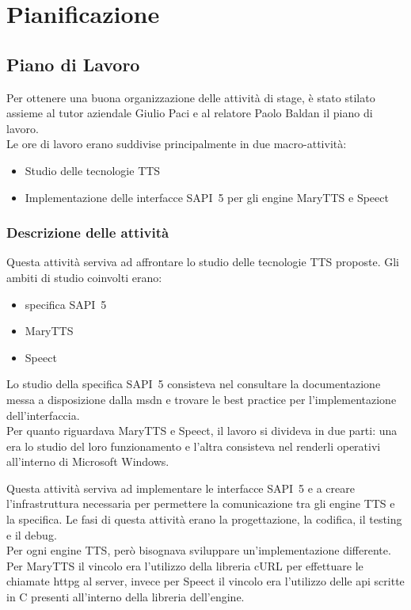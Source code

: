 \chapter{Pianificazione} %
\thispagestyle{empty}

\newpage
\section{Piano di Lavoro}
Per ottenere una buona organizzazione delle attività di stage, è stato stilato assieme al tutor aziendale Giulio Paci e al relatore Paolo Baldan il piano di lavoro.\\
Le ore di lavoro erano suddivise principalmente in due macro-attività:
\begin{itemize}
	\item Studio delle tecnologie TTS
	\item Implementazione delle interfacce SAPI~5 per gli engine MaryTTS e Speect
\end{itemize}

\subsection{Descrizione delle attività}

\begin{description}[style=unboxed]
	\item[Studio delle tecnologie TTS] Questa attività serviva ad affrontare lo studio delle tecnologie TTS proposte. Gli ambiti di studio coinvolti erano:
	\begin{itemize}
		\item specifica SAPI~5
		\item MaryTTS
		\item Speect
	\end{itemize}
	Lo studio della specifica SAPI~5 consisteva nel consultare la documentazione messa a disposizione dalla \gls{msdn} e trovare le best practice per l'implementazione dell'interfaccia.\\
	Per quanto riguardava MaryTTS e Speect, il lavoro si divideva in due parti: una era lo studio del loro funzionamento e l'altra consisteva nel renderli operativi all'interno di Microsoft Windows.\\
	
	\item[Implementazione delle interfacce SAPI~5 per gli engine MaryTTS e Speect]
	Questa attività serviva ad implementare le interfacce SAPI~5 e a creare l'infrastruttura necessaria per permettere la comunicazione tra gli engine TTS e la specifica. Le fasi di questa attività erano la progettazione, la codifica, il testing e il debug.\\
	Per ogni engine TTS, però bisognava sviluppare un'implementazione differente. Per MaryTTS il vincolo era l'utilizzo della libreria cURL per effettuare le chiamate \gls{httpg} al server, invece per Speect il vincolo era l'utilizzo delle \gls{api} scritte in C presenti all'interno della libreria dell'engine.
	  
\end{description}

